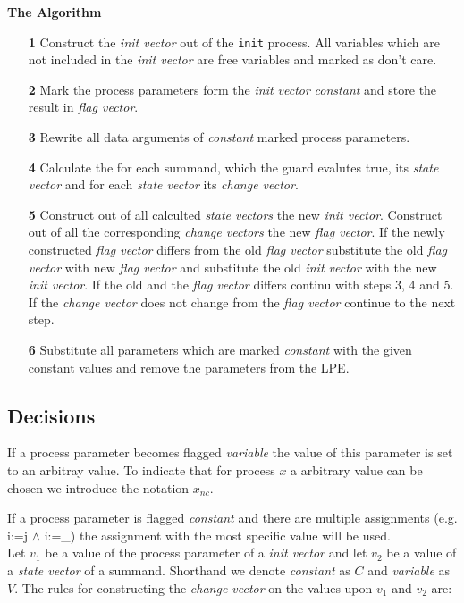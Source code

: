 \documentclass[a4paper,9pt]{article}
\begin{document}
\textbf{The Algorithm}
\begin{enumerate}
\item[\textbf{1}] Construct the \textit{init vector} out of the \verb"init" process.
All variables which are not included in the \textit{init vector} are free variables and marked as don't care.
\item[\textbf{2}] Mark the process parameters form the \textit{init vector} \textit{constant} and 
store the result in \textit{flag vector}.
\item[\textbf{3}] Rewrite all data arguments of \textit{constant} marked process parameters.
\item[\textbf{4}] Calculate the for each summand, which the guard evalutes true, its \textit{state vector} and 
for each \textit{state vector} its \textit{change vector}.
\item[\textbf{5}] Construct out of all calculted \textit{state vectors} the new \textit{init vector}.
Construct out of all the corresponding \textit{change vectors} the new \textit{flag vector}. 
If the newly constructed \textit{flag vector} 
differs from the old \textit{flag vector} substitute the old \textit{flag vector} with new \textit{flag vector} and
 substitute the old \textit{init vector} with the new  \textit{init vector}. 
 If the old and the \textit{flag vector} differs continu with steps 3, 4 and 5.
 If the \textit{change vector} does not change from the \textit{flag vector} continue to the next step.
\item[\textbf{6}] Substitute all parameters which are marked \textit{constant} with the given constant values and remove
the parameters from the LPE.
\end{enumerate}

\subsection{Decisions}

If a process parameter becomes flagged \textit{variable} the value of this parameter is set to an arbitray value.
To indicate that for process $x$ a arbitrary value can be chosen we introduce the notation $x_{nc}$.
    
If a process parameter is flagged \textit{constant} and there are multiple assignments (e.g. i:=j $\wedge$ i:=\_) 
the assignment with the most specific value will be used. \\
Let $v_{1}$ be a value of the process parameter of a \textit{init vector} and let $v_{2}$ be a value of a 
\textit{state vector} of a summand. 
Shorthand we denote \textit{constant} as $C$ and \textit{variable} as $V$.
The rules for constructing the \textit{change vector} on the values upon $v_{1}$ and $v_{2}$ are:
\end{document}
